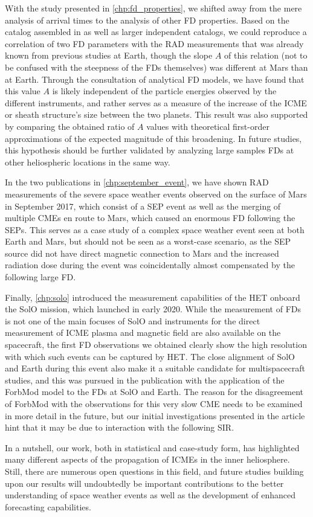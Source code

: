 With the study presented in \autoref{chp:fd_properties}, we shifted away from the mere analysis of arrival times to the analysis of other \ac{FD} properties. Based on the catalog assembled in \citet{Forstner-2019} as well as larger independent catalogs, we could reproduce a correlation of two \ac{FD} parameters with the \ac{RAD} measurements that was already known from previous studies at Earth, though the slope $A$ of this relation (not to be confused with the steepness of the \acp{FD} themselves) was different at Mars than at Earth. Through the consultation of analytical \ac{FD} models, we have found that this value $A$ is likely independent of the particle energies observed by the different instruments, and rather serves as a measure of the increase of the \ac{ICME} or sheath structure's size between the two planets. This result was also supported by comparing the obtained ratio of $A$ values with theoretical first-order approximations of the expected magnitude of this broadening. In future studies, this hypothesis should be further validated by analyzing large samples \acp{FD} at other heliospheric locations in the same way.

In the two publications in \autoref{chp:september_event}, we have shown \ac{RAD} measurements of the severe space weather events observed on the surface of Mars in September 2017, which consist of a \ac{SEP} event as well as the merging of multiple \acp{CME} en route to Mars, which caused an enormous \ac{FD} following the \acp{SEP}. This serves as a case study of a complex space weather event seen at both Earth and Mars, but should not be seen as a worst-case scenario, as the \ac{SEP} source did not have direct magnetic connection to Mars and the increased radiation dose during the event was coincidentally almost compensated by the following large \ac{FD}.

Finally, \autoref{chp:solo} introduced the measurement capabilities of the \ac{HET} onboard the \ac{SolO} mission, which launched in early 2020. While the measurement of \acp{FD} is not one of the main focuses of \ac{SolO} and instruments for the direct measurement of \ac{ICME} plasma and magnetic field are also available on the spacecraft, the first \ac{FD} observations we obtained clearly show the high resolution with which such events can be captured by \ac{HET}. The close alignment of \ac{SolO} and Earth during this event also make it a suitable candidate for multispacecraft studies, and this was pursued in the publication with the application of the \acs{ForbMod} model to the \acp{FD} at \ac{SolO} and Earth. The reason for the disagreement of \acs{ForbMod} with the observations for this very slow \ac{CME} needs to be examined in more detail in the future, but our initial investigations presented in the article hint that it may be due to interaction with the following \acl{SIR}.

In a nutshell, our work, both in statistical and case-study form, has highlighted many different aspects of the propagation of \acp{ICME} in the inner heliosphere. Still, there are numerous open questions in this field, and future studies building upon our results will undoubtedly be important contributions to the better understanding of space weather events as well as the development of enhanced forecasting capabilities.